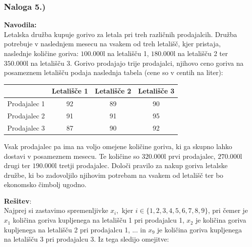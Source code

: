 \documentclass[a4paper,11pt]{article}
\begin{document}
\subsubsection{Naloga 5.)}
\label{task:maj2008_5}

\textbf{Navodila:} \\
Letalska družba kupuje gorivo za letala pri treh različnih prodajalcih. Družba potrebuje v naslednjem mesecu na vsakem od treh letališč, kjer pristaja, naslednje količine goriva: $100.000 \si{\litre}$  na letališču 1, $180.000 \si{\litre}$ na letališču 2 ter $350.000 \si{\litre}$ na letališču 3. Gorivo prodajajo trije prodajalci, njihovo ceno goriva na posameznem letališču podaja naslednja tabela (cene so v centih na liter):
\begin{table}[hbt]
 	\centering
	\begin{tabular}{| l | c | c | c | }
		\hline
 			& Letališče 1 & Letališče 2  & Letališče 3 \\ \hline
		Prodajalec 1 & 92 & 89 & 90 \\ \hline
		Prodajalec 2 & 91 & 91 & 95 \\ \hline
		Prodajalec 3 & 87 & 90 & 92 \\ \hline
	\end{tabular}
\end{table}

Vsak prodajalec pa ima na voljo omejene količine goriva, ki ga skupno lahko dostavi v posameznem mesecu. Te količine so $320.000\si{\litre}$ prvi prodajalec, $270.000\si{\litre}$ drugi ter $190.000\si{\litre}$  tretji prodajalec. Določi pravilo za nakup goriva letalske družbe, ki bo zadovoljilo njihovim potrebam na vsakem od letališč ter bo ekonomsko čimbolj ugodno.

\textbf{Rešitev}: \\
Najprej si zastavimo spremenljivke $x_i,$ kjer  $i  \in \{1, 2, 3, 4, 5, 6, 7, 8, 9\}$, pri čemer je $x_1$ količina goriva kupljenega na letališču 1 pri prodajalcu 1, $x_2$ je količina goriva kupljenega na letališču 2 pri prodajalcu 1, ... in $x_9$ je količina goriva kupljenega na letališču 3 pri prodajalcu 3. Iz tega sledijo omejitve:
\end{document}

